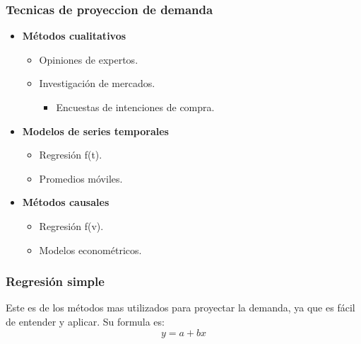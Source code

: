\documentclass{templateNote}
\begin{document}
\subsubsection*{Tecnicas de proyeccion de demanda}
\vspace{0.5cm}
\begin{center}
    \begin{minipage}[H]{0.45\textwidth}
        \begin{itemize}
            \item \textbf{Métodos cualitativos} 
            \begin{itemize}
                \item Opiniones de expertos.
                \item Investigación de mercados.
                \begin{itemize}
                    \item Encuestas de intenciones de compra.
                \end{itemize}
            \end{itemize}
        \end{itemize}
    \end{minipage}
    \hfill
    \begin{minipage}[H]{0.45\textwidth}
        \begin{itemize}
            \item \textbf{Modelos de series temporales}
            \begin{itemize}
                \item Regresión f(t).
                \item Promedios móviles.
            \end{itemize}
            \item \textbf{Métodos causales}
            \begin{itemize}
                \item Regresión f(v).
                \item Modelos econométricos.
            \end{itemize} 
        \end{itemize}
    \end{minipage}
\end{center}

\subsubsection*{Regresión simple}
Este es de los métodos mas utilizados para proyectar la demanda, ya que es fácil de entender y aplicar. Su formula es:
\begin{equation*}
    y = a + bx
\end{equation*}
\end{document}
